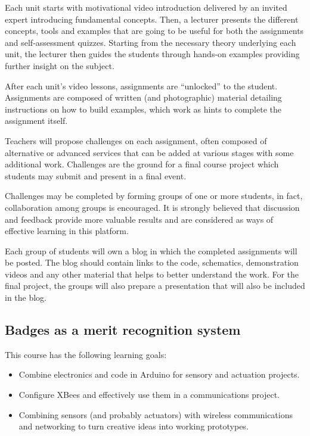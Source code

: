 \documentclass[a4paper,oneside]{book}   %
\begin{document}
Each unit starts with motivational video introduction delivered by an invited expert introducing fundamental concepts.
Then, a lecturer presents the different concepts, tools and examples that are going to be useful for both the assignments and self-assessment quizzes.
Starting from the necessary theory underlying each unit, the lecturer then guides the students through hands-on examples providing further insight on the subject.

After each unit's video lessons, assignments are ``unlocked'' to the student. Assignments are composed of written (and photographic) material detailing instructions on how to build examples, which work as hints to complete the assignment itself.


Teachers will propose challenges on each assignment, often composed of alternative or advanced services that can be added at various stages with some additional work. Challenges are the ground for a final course project which students may submit and present in a final event.

Challenges may be completed by forming groups of one or more students, in fact, collaboration among groups is encouraged. It is strongly believed that discussion and feedback provide more valuable results and are considered as ways of effective learning in this platform.

Each group of students will own a blog in which the completed assignments will be posted.
The blog should contain links to the code, schematics, demonstration videos and any other material that helps to better understand the work.
For the final project, the groups will also prepare a presentation that will also be included in the blog.

\subsection{Badges as a merit recognition system}

This course has the following learning goals:
\begin{itemize}
\item Combine electronics and code in Arduino for sensory and actuation projects.
\item Configure XBees and effectively use them in a communications project.
\item Combining sensors (and probably actuators) with wireless communications and networking to turn creative ideas into working prototypes.
\end{itemize}
\end{document}
